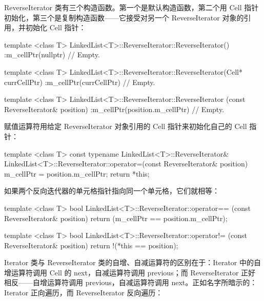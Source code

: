 ReverseIterator 类有三个构造函数。第一个是默认构造函数，第二个用 Cell 指针初始化，第三个是复制构造函数——它接受对另一个 ReverseIterator 对象的引用，并初始化 Cell 指针：

\begin{codebox}
template <class T>
LinkedList<T>::ReverseIterator::ReverseIterator()
 :m_cellPtr(nullptr) {
  // Empty.
}

template <class T>
LinkedList<T>::ReverseIterator::ReverseIterator(Cell* currCellPtr)
 :m_cellPtr(currCellPtr) {
  // Empty.
}

template <class T>
LinkedList<T>::ReverseIterator::ReverseIterator
                                (const ReverseIterator& position)
 :m_cellPtr(position.m_cellPtr) {
  // Empty.
}
\end{codebox}

赋值运算符用给定 ReverseIterator 对象引用的 Cell 指针来初始化自己的 Cell 指针：

\begin{codebox}
template <class T>
const typename LinkedList<T>::ReverseIterator&
LinkedList<T>::ReverseIterator::operator=(const ReverseIterator&
position) {
  m_cellPtr = position.m_cellPtr;
  return *this;
}
\end{codebox}

如果两个反向迭代器的单元格指针指向同一个单元格，它们就相等：

\begin{codebox}
template <class T>
bool LinkedList<T>::ReverseIterator::operator==
                           (const ReverseIterator& position) {
  return (m_cellPtr == position.m_cellPtr);
}

template <class T>
bool LinkedList<T>::ReverseIterator::operator!=
                           (const ReverseIterator& position) {
  return !(*this == position);
}
\end{codebox}

Iterator 类与 ReverseIterator 类的自增、自减运算符的区别在于：Iterator 中的自增运算符调用 Cell 的 next，自减运算符调用 previous；而 ReverseIterator 正好相反——自增运算符调用 previous，自减运算符调用 next。正如名字所暗示的：Iterator 正向遍历，而 ReverseIterator 反向遍历：

